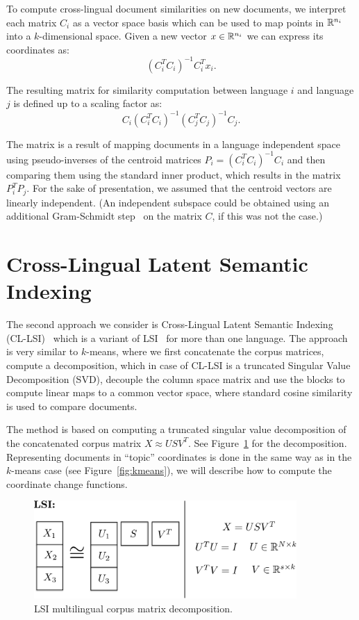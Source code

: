 To compute  cross-lingual document similarities on new documents, we interpret each matrix $C_i$ 
as a vector space basis which can be used to map points in $\mathbb{R}^{n_i}$ into a $k$-dimensional space. Given
a new vector $x \in \mathbb{R}^{n_i}$ we can express its coordinates as:
$$(C_i^T C_i)^{-1} C_i^T x_i.$$

The resulting matrix for similarity computation between language $i$ and language $j$
is defined up to a scaling factor as:
$$C_i(C_i^T C_i)^{-1} (C_j^T C_j)^{-1} C_j.$$

The matrix is a result of mapping documents in a language independent space using
pseudo-inverses of the centroid matrices $P_i = (C_i^T C_i)^{-1} C_i$ and then
comparing them using the standard inner product, which results in the matrix
$P_i^T P_j$. For the sake of presentation, we assumed that the centroid vectors
are linearly independent. (An independent subspace could be obtained using an
additional Gram-Schmidt step~\cite{golub} on the matrix $C$, if this was not the case.)

\section{Cross-Lingual Latent Semantic Indexing}\label{chap:crosslingual:LSI}

The second approach we consider is Cross-Lingual Latent Semantic Indexing
(CL-LSI)~\cite{cl_lsi} which is a variant of LSI~\cite{lsi} for more than one language.
The approach is very similar to $k$-means, where we first concatenate the corpus matrices,
compute a decomposition, which in case of CL-LSI is a truncated Singular Value
Decomposition (SVD), decouple the column space matrix and use the blocks to compute
linear maps to a common vector space, where standard cosine similarity is used to
compare documents.

The method is based on computing a truncated singular value decomposition of the concatenated
corpus matrix $X \approx U S V^T$. See Figure~\ref{fig:lsi} for the decomposition. Representing
documents in ``topic'' coordinates is done in the same way as in the $k$-means case
(see Figure~\ref{fig:kmeans}), we will describe how to compute the coordinate change functions.

\begin{figure}[tbp]
\centering
\includegraphics[width=10cm]{figures/lsi.pdf}
\caption{\label{fig:lsi} LSI multilingual corpus matrix decomposition.}
\end{figure}

